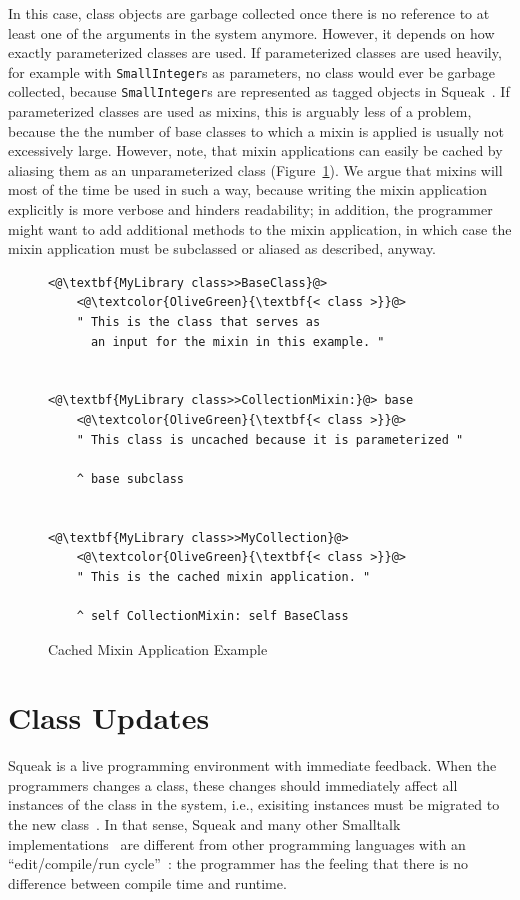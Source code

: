 In this case, class objects are garbage collected once there is no reference to at least one of the arguments in the system anymore. However, it depends on how exactly parameterized classes are used. If parameterized classes are used heavily, for example with \texttt{SmallInteger}s as parameters, no class would ever be garbage collected, because \texttt{SmallInteger}s are represented as tagged objects in Squeak~\cite{Bolz:2008:BFO:1482373.1482382, papetechreport}. If parameterized classes are used as mixins, this is arguably less of a problem, because the the number of base classes to which a mixin is applied is usually not excessively large. However, note, that mixin applications can easily be cached by aliasing them as an unparameterized class (Figure~\ref{fig:impl_cached_mixin_application}). We argue that mixins will most of the time be used in such a way, because writing the mixin application explicitly is more verbose and hinders readability; in addition, the programmer might want to add additional methods to the mixin application, in which case the mixin application must be subclassed or aliased as described, anyway.

\begin{figure}[!htp]
\begin{lstlisting}
<@\textbf{MyLibrary class>>BaseClass}@>
    <@\textcolor{OliveGreen}{\textbf{< class >}}@>
    " This is the class that serves as 
      an input for the mixin in this example. "
	

<@\textbf{MyLibrary class>>CollectionMixin:}@> base
    <@\textcolor{OliveGreen}{\textbf{< class >}}@>
    " This class is uncached because it is parameterized "

    ^ base subclass


<@\textbf{MyLibrary class>>MyCollection}@>
    <@\textcolor{OliveGreen}{\textbf{< class >}}@>
    " This is the cached mixin application. "

    ^ self CollectionMixin: self BaseClass
\end{lstlisting}
\caption{Cached Mixin Application Example}
\label{fig:impl_cached_mixin_application}
\end{figure}

\section{Class Updates}
Squeak is a live programming environment with immediate feedback. When the programmers changes a class, these changes should immediately affect all instances of the class in the system, i.e., exisiting instances must be migrated to the new class~\cite{casaccio2011bootstrapping}. In that sense, Squeak and many other Smalltalk implementations~\cite{Penney:1987:CMG:38765.38817} are different from other programming languages with an ``edit/compile/run cycle''~\cite{conf/sofsem/NierstraszG10}: the programmer has the feeling that there is no difference between compile time and runtime.

